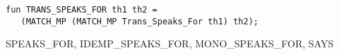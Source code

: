 \IMPLEMENTATION
\begin{holboxed}
\begin{verbatim}
fun TRANS_SPEAKS_FOR th1 th2 =
   (MATCH_MP (MATCH_MP Trans_Speaks_For th1) th2);
\end{verbatim}
\end{holboxed}

\SEEALSO
SPEAKS\_FOR, IDEMP\_SPEAKS\_FOR, MONO\_SPEAKS\_FOR, SAYS
\ENDDOC

